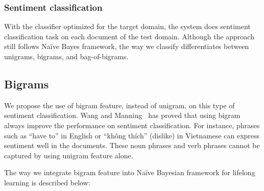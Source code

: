 \subsubsection{Sentiment classification}
With the classifier optimized for the target domain, the system does sentiment classification task on each document of the test domain. 
Although the approach still follows Naïve Bayes framework, the way we classify differentiates between unigrams, bigrams, and bag-of-bigrams.



\subsection{Bigrams}
We propose the use of bigram feature, instead of unigram, on this type of sentiment classification.
Wang and Manning~\cite{wang-manning:2012:ACL2012short} has proved that using bigram always improve the performance on sentiment classification.
For instance, phrases such as ``have to'' in English or ``không thích'' (dislike) in Vietnamese can express sentiment well in the documents.
These noun phrases and verb phrases cannot be captured by using unigram feature alone.

The way we integrate bigram feature into Naïve Bayesian framework for lifelong learning is described below:

